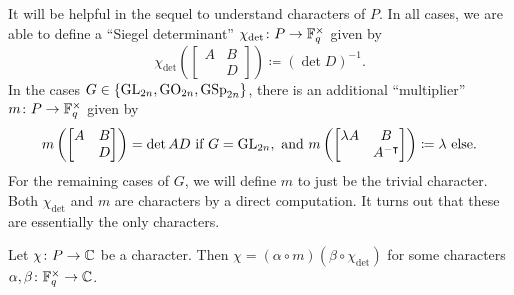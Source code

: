 It will be helpful in the sequel to understand characters of $P$. In all cases, we are able to define a ``Siegel determinant'' $\chi_{\det}\colon P\to\mathbb F_q^\times$ given by
\[\chi_{\det}\left(\begin{bmatrix}
    A & B \\
      & D
\end{bmatrix}\right)\coloneqq(\det D)^{-1}.\]
In the cases $G\in\{\mathrm{GL}_{2n},\mathrm{GO}_{2n},\mathrm{GSp}_{2n}\}$, there is an additional ``multiplier'' $m\colon P\to\mathbb F_q^\times$ given by
\[m\left(\begin{bmatrix}
    A & B \\
      & D
\end{bmatrix}\right)=\det AD\text{ if }G=\mathrm{GL}_{2n},\text{ and }m\left(\begin{bmatrix}
    \lambda A & B \\
      & A^{-\intercal}
\end{bmatrix}\right)\coloneqq\lambda\text{ else}.\]
For the remaining cases of $G$, we will define $m$ to just be the trivial character. Both $\chi_{\det}$ and $m$ are characters by a direct computation. It turns out that these are essentially the only characters.
\begin{lemma} \label{lem:decompose-character}
    Let $\chi\colon P\to\mathbb C$ be a character. Then $\chi=(\alpha\circ m)(\beta\circ\chi_{\det})$ for some characters $\alpha,\beta\colon\mathbb F_q^\times\to\mathbb C$.
\end{lemma}
